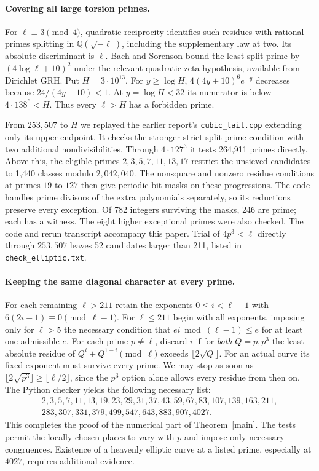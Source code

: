 \documentclass[11pt]{article}
\newcommand{\Q}{\mathbb Q}
\begin{document}
\paragraph{Covering all large torsion primes.}
For $\ell\equiv3\pmod4$, quadratic reciprocity identifies such
residues with rational primes splitting in $\Q(\sqrt{-\ell})$,
including the supplementary law at two. Its absolute discriminant
is $\ell$. Bach and Sorenson \cite[Thm.~5.1]{bs} bound the least split
prime by $(4\log\ell+10)^2$ under the relevant quadratic zeta
hypothesis, available from Dirichlet GRH. Put $H=3\cdot10^{13}$.
For $y\ge\log H$, $4(4y+10)^6e^{-y}$ decreases because
$24/(4y+10)<1$. At $y=\log H<32$ its numerator is below
$4\cdot138^6<H$. Thus every $\ell>H$ has a forbidden prime.

From $253{,}507$ to $H$ we replayed the earlier report's
\texttt{cubic\_tail.cpp} extending only its upper endpoint.
It checks the stronger strict split-prime condition with two
additional nondivisibilities. Through $4\cdot127^3$ it tests
264,911 primes directly. Above this, the eligible primes
$2,3,5,7,11,13,17$ restrict the unsieved candidates to 1,440 classes
modulo $2{,}042{,}040$. The nonsquare and nonzero residue conditions
at primes $19$ to $127$ then give periodic bit masks on these
progressions. The code handles prime divisors of the extra
polynomials separately, so its reductions preserve every exception.
Of 782 integers surviving the masks, 246 are prime; each has a
witness. The eight higher exceptional primes were also checked.
The code and rerun transcript accompany this paper. Trial of
$4p^3<\ell$ directly through $253{,}507$ leaves 52 candidates
larger than 211, listed in \texttt{check\_elliptic.txt}.

\paragraph{Keeping the same diagonal character at every prime.}
For each remaining $\ell>211$ retain the exponents $0\le i<\ell-1$
with $6(2i-1)\equiv0\pmod{\ell-1}$. For $\ell\le211$ begin with
all exponents, imposing only for $\ell>5$ the necessary condition
that $ei\bmod(\ell-1)\le e$ for at least one admissible $e$.
For each prime $p\ne\ell$, discard $i$ if for \emph{both}
$Q=p,p^3$ the least absolute residue of
$Q^i+Q^{1-i}\pmod\ell$ exceeds $\lfloor2\sqrt{Q}\rfloor$.
For an actual curve its fixed exponent must survive every prime.
We may stop as soon as $\lfloor2\sqrt{p^3}\rfloor\ge\lfloor
\ell/2\rfloor$, since the $p^3$ option alone allows every residue
from then on. The Python checker yields the following necessary list:
\[
\begin{gathered}
 2,3,5,7,11,13,19,23,29,31,37,43,59,67,83,107,139,163,211,\\
 283,307,331,379,499,547,643,883,907,4027 .
\end{gathered}
\]
This completes the proof of the numerical part of
Theorem~\ref{main}. The tests permit the locally chosen places to
vary with $p$ and impose only necessary congruences. Existence of a
heavenly elliptic curve at a listed prime, especially at $4027$,
requires additional evidence.
\end{document}
